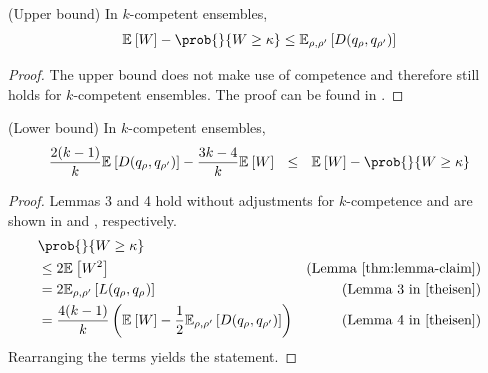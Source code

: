\documentclass[../main.tex]{subfiles}
\begin{document}
\begin{theorem} (Upper bound) In $k$-competent ensembles,
$$
\mathbb{E}_{}\left[ W \right] - \prob{}{W \geq \kappa} \leq \mathbb{E}_{\rho, \rho'}\left[ D(q_{\rho}, q_{\rho'}) \right]  
$$
\end{theorem}
\begin{proof}
    The upper bound does not make use of competence and therefore still holds for $k$-competent ensembles. The proof can be found in \cite{theisen}.
\end{proof}

\begin{theorem} (Lower bound) In $k$-competent ensembles,
$$
 \frac{2(k-1)}{k}\mathbb{E}_{}\left[ D(q_{\rho}, q_{\rho'}) \right]  - \frac{3k-4}{k}\mathbb{E}_{}\left[ W \right] 
 ~ ~ \leq ~ ~
\mathbb{E}_{}\left[ W \right] - \prob{}{W \geq \kappa} 
$$
\end{theorem}
\begin{proof}
Lemmas 3 and 4 hold without adjustments for $k$-competence and are shown in \cite{cited-by-theisen} and \cite{theisen}, respectively.
\begin{align*}
& \prob{}{W \geq \kappa}  \\
& \leq  2 \mathbb{E}_{}\left[ W^2 \right]  & \text{(Lemma \ref{thm:lemma-claim})}   \\
& =  2\mathbb{E}_{\rho, \rho'}\left[ L(q_{\rho}, q_{\rho_{}}) \right]  & \text{(Lemma 3 in \cite{theisen})} \\
& = \frac{4(k-1)}{k} \left(  \mathbb{E}_{}\left[ W  \right] - \frac{1}{2} \mathbb{E}_{\rho, \rho'}\left[ D(q_{\rho}, q_{\rho'}) \right]    \right) & \text{(Lemma 4 in \cite{theisen})} 
\end{align*}
Rearranging the terms yields the statement.
\end{proof}
\end{document}
